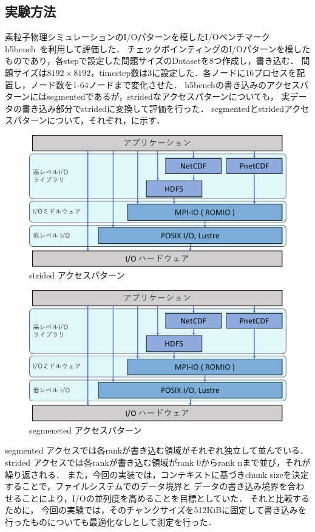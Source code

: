 \documentclass[submit,techrep,noauthor]{ipsj}
\begin{document}
\subsection{実験方法}
素粒子物理シミュレーションのI/Oパターンを模したI/Oベンチマークh5bench~\cite{h5bench}を利用して評価した．
チェックポインティングのI/Oパターンを模したものであり，各stepで設定した問題サイズのDatasetを8つ作成し，書き込む．
問題サイズは$8192 \times 8192$，timestep数は3に設定した．各ノードに16プロセスを配置し，ノード数を1-64ノードまで変化させた．
h5benchの書き込みのアクセスパターンにはsegmentedであるが，stridedなアクセスパターンについても，
実データの書き込み部分でstridedに変換して評価を行った．
segmentedとstridedアクセスパターンについて，それぞれ，に示す．
\begin{figure}[t]
	\centering
	\includegraphics[page=18,width=\linewidth]{figure-crop.pdf}
	\caption{strided アクセスパターン}
	\label{fig:stridedaccess}
\end{figure}
\begin{figure}[t]
	\centering
	\includegraphics[page=19,width=\linewidth]{figure-crop.pdf}
	\caption{segmeneted アクセスパターン}
	\label{fig:segmenetedaccess}
\end{figure}
segmented アクセスでは各rankが書き込む領域がそれぞれ独立して並んでいる．
strided アクセスでは各rankが書き込む領域がrank 0からrank nまで並び，それが繰り返される．
また，今回の実装では，コンテキストに基づきchunk sizeを決定することで，ファイルシステムでのデータ境界と
データの書き込み境界を合わせることにより，I/Oの並列度を高めることを目標としていた．
それと比較するために，
今回の実験では，そのチャンクサイズを512KiBに固定して書き込みを行ったものについても最適化なしとして測定を行った．
\end{document}
